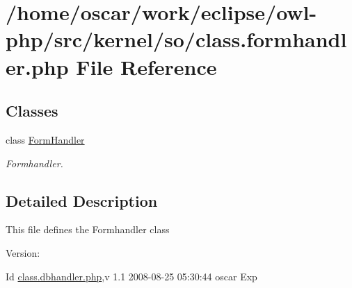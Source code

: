 \hypertarget{class_8formhandler_8php}{
\section{/home/oscar/work/eclipse/owl-php/src/kernel/so/class.formhandler.php File Reference}
\label{class_8formhandler_8php}
}
\subsection*{Classes}
\begin{CompactItemize}
\item 
class \hyperlink{classFormHandler}{FormHandler}
\begin{CompactList}\small\item\em Formhandler. \item\end{CompactList}\end{CompactItemize}


\subsection{Detailed Description}
This file defines the Formhandler class \begin{Desc}
\item[Version:]\end{Desc}
\begin{Desc}
\item[Id]\hyperlink{class_8dbhandler_8php}{class.dbhandler.php},v 1.1 2008-08-25 05:30:44 oscar Exp \end{Desc}
